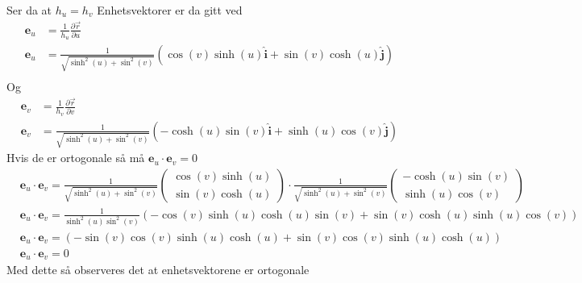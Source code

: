 \documentclass[a4paper,10pt,norsk]{article}
\newcommand{\uvec}[1]{\boldsymbol{\hat{\textbf{#1}}}}
\begin{document}
	Ser da at $h_u = h_v$
	Enhetsvektorer er da gitt ved 
	\begin{align*}
		\mathbf{e}_u &= \frac{1}{h_u} \frac{\partial \vec{r} }{\partial u} \\
		\mathbf{e}_u &= \frac{1}{\sqrt{\sinh^2 \left( u \right) + \sin^2 \left( v \right) }} \left( \cos(v) \sinh \left( u \right) \uvec{i} + \sin(v) \cosh \left( u \right) \uvec{j} \right) \\
	\end{align*}
	Og
	\begin{align*}
		\mathbf{e}_v &= \frac{1}{h_v} \frac{\partial \vec{r} }{\partial v} \\
		\mathbf{e}_v &= \frac{1}{\sqrt{\sinh^2 \left( u \right) + \sin^2 \left( v \right) }} \left( -\cosh \left( u \right) \sin(v) \uvec{i} + \sinh \left( u \right)  \cos(v) \uvec{j} \right) 
	\end{align*}
	Hvis de er ortogonale så må $\mathbf{e}_u \cdot \mathbf{e}_v = 0$
	\begin{align*}
		&\mathbf{e}_u \cdot \mathbf{e}_v = 
			\frac{1}{\sqrt{\sinh^2 \left( u \right) + \sin^2 \left( v \right) }}
			\begin{pmatrix}
			\cos(v) \sinh \left( u \right) \\ \sin(v) \cosh \left( u \right)
			\end{pmatrix}
			\cdot \frac{1}{\sqrt{\sinh^2 \left( u \right) + \sin^2 \left( v \right) }}
			\begin{pmatrix}
			-\cosh \left( u \right) \sin(v) \\
			\sinh \left( u \right) \cos(v)
			\end{pmatrix}\\
		&\mathbf{e}_u \cdot \mathbf{e}_v = \frac{1}{\sinh^2 \left( u \right) \sin^2 \left( v \right) } \left(- \cos(v) \sinh \left( u \right) \cosh \left( u \right) \sin(v)
		+ \sin(v) \cosh \left( u \right) \sinh \left( u \right) \cos(v) \right) \\
		&\mathbf{e}_u \cdot \mathbf{e}_v = \left( - \sin(v) \cos(v) \sinh \left( u \right) \cosh \left( u \right) + \sin(v) \cos(v) \sinh \left( u \right) \cosh \left( u \right)  \right) \\
		&\mathbf{e}_u \cdot \mathbf{e}_v = 0
	\end{align*}
	Med dette så observeres det at enhetsvektorene er ortogonale
\end{document}
